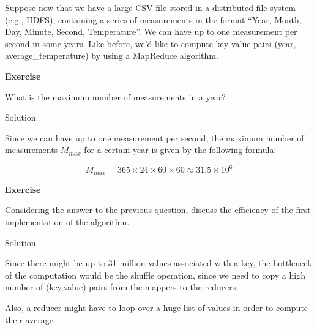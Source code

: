 \documentclass[
]{article}
\newenvironment{infobox}[1]
  {
  \begin{itemize}
  \renewcommand{\labelitemi}{
    \raisebox{-.7\height}[0pt][0pt]{
      
    }
  }
  \setlength{\fboxsep}{1em}
  \begin{whitebox}
  \item
  }
  {
  \end{whitebox}
  \end{itemize}
  }
\theoremstyle{definition}
\theoremstyle{definition}
\theoremstyle{definition}
\theoremstyle{remark}
\let\BeginKnitrBlock\begin \let\EndKnitrBlock\end
\begin{document}
Suppose now that we have a large CSV file
stored in a distributed file system (e.g., HDFS),
containing a series of measurements in the format ``Year, Month, Day, Minute, Second, Temperature''.
We can have up to one measurement per second in some years.
Like before, we'd like to compute key-value pairs (year, average\_temperature) by using
a MapReduce algorithm.

\begin{infobox}{exercisebox}

\textbf{Exercise}

\BeginKnitrBlock{exercise}
\protect\hypertarget{exr:unnamed-chunk-2}{}{\label{exr:unnamed-chunk-2} }
What is the maximum number of measurements in a year?
\EndKnitrBlock{exercise}

\end{infobox}

Solution

\begin{infobox}{exercisebox}

Since we can have up to one measurement per second, the maximum number of
measurements \(M_{max}\) for a certain year is given by the following formula:

\[
M_{max} = 365 \times 24 \times 60 \times 60 \approx 31.5 \times 10^6 
\]

\end{infobox}

\begin{infobox}{exercisebox}

\textbf{Exercise}

\BeginKnitrBlock{exercise}
\protect\hypertarget{exr:unnamed-chunk-3}{}{\label{exr:unnamed-chunk-3} }
Considering the answer to the previous question, discuss the efficiency
of the first implementation of the algorithm.
\EndKnitrBlock{exercise}

\end{infobox}

Solution

\begin{infobox}{exercisebox}

Since there might be up to 31 million values
associated with a key, the bottleneck of the computation would be
the shuffle operation, since we need to copy a high number of
(key,value) pairs from the mappers to the reducers.

Also, a reducer might have to
loop over a huge list of values in order to compute their average.

\end{infobox}
\end{document}
